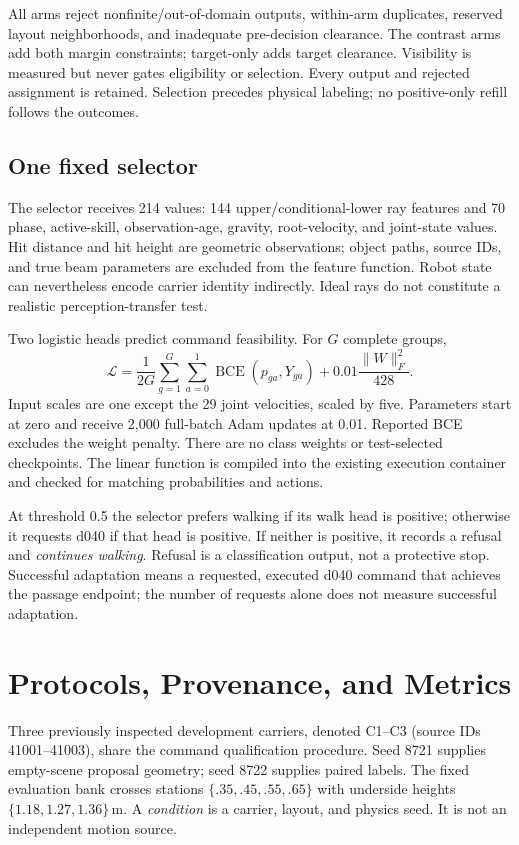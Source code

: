 \documentclass[letterpaper,10pt,conference]{ieeeconf}
\begin{document}
All arms reject nonfinite/out-of-domain outputs, within-arm duplicates, reserved
layout neighborhoods, and inadequate pre-decision clearance. The contrast arms
add both margin constraints; target-only adds target clearance. Visibility is
measured but never gates eligibility or selection. Every output and rejected
assignment is retained. Selection precedes physical labeling; no positive-only
refill follows the outcomes.

\subsection{One fixed selector}
The selector receives 214 values: 144 upper/conditional-lower ray features and
70 phase, active-skill, observation-age, gravity, root-velocity, and joint-state
values. Hit distance and hit height are geometric observations; object paths,
source IDs, and true beam parameters are excluded from the feature function.
Robot state can nevertheless encode carrier identity indirectly. Ideal rays
do not constitute a realistic perception-transfer test.

Two logistic heads predict command feasibility. For $G$ complete groups,
\begin{equation}
\mathcal L=\frac{1}{2G}\sum_{g=1}^{G}\sum_{a=0}^{1}
\operatorname{BCE}(p_{ga},Y_{ga})+
0.01\frac{\|W\|_F^2}{428}.
\end{equation}
Input scales are one except the 29 joint velocities, scaled by five. Parameters
start at zero and receive 2,000 full-batch Adam updates at 0.01. Reported BCE
excludes the weight penalty. There are no class weights or test-selected
checkpoints. The linear function is compiled into the existing execution
container and checked for matching probabilities and actions.

At threshold 0.5 the selector prefers walking if its walk head is positive;
otherwise it requests d040 if that head is positive. If neither is positive,
it records a refusal and \emph{continues walking}. Refusal is a classification
output, not a protective stop. Successful adaptation means a requested,
executed d040 command that achieves the passage endpoint; the number of
requests alone does not measure successful adaptation.

\section{Protocols, Provenance, and Metrics}
Three previously inspected development carriers, denoted C1--C3 (source IDs
41001--41003), share the command qualification procedure. Seed 8721 supplies
empty-scene proposal geometry; seed 8722 supplies paired labels. The fixed
evaluation bank crosses stations $\{.35,.45,.55,.65\}$ with underside heights
$\{1.18,1.27,1.36\}$\,m. A \emph{condition} is a carrier, layout, and physics
seed. It is not an independent motion source.
\end{document}
